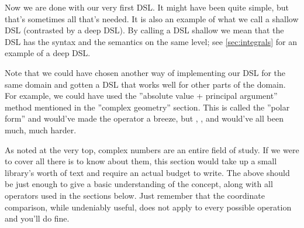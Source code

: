 
\begin{newtext}
Now we are done with our very first DSL. It might have been quite simple, but that's sometimes all that's needed.
It is also an example of what we call a shallow DSL (contrasted by a deep DSL). By calling a DSL shallow we mean that the DSL has the syntax and the semantics on the same level; see \ref{sec:integrals} for an example of a deep DSL.

Note that we could have chosen another way of implementing our DSL for the same domain and gotten a DSL that works well for other parts of the domain. For example, we could have used the ''absolute value + principal argument'' method mentioned in the ''complex geometry'' section. This is called the ''polar form'' and would've made the  operator a breeze, but , ,  and  would've all been much, much harder.

\end{newtext}

As noted at the very top, complex numbers are an entire field of study. If we were to cover all there is to know about them, this section would take up a small library's worth of text and require an actual budget to write. The above should be just enough to give a basic understanding of the concept, along with all operators used in the sections below. Just remember that the coordinate comparison, while undeniably useful, does not apply to every possible operation and you'll do fine.

